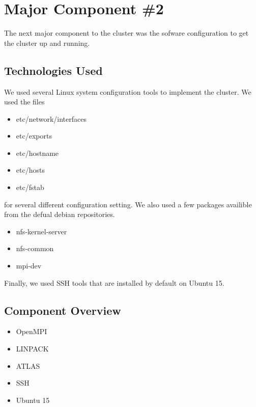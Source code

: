 
\section{Major Component \#2 }

The next major component to the cluster was the sofware configuration to get the cluster up and running.

\subsection{Technologies  Used}
We used several Linux system configuration tools to implement the cluster. We used the files
\begin{itemize}
	\item etc/network/interfaces
	\item etc/exports
	\item etc/hostname
	\item etc/hosts
	\item etc/fstab
\end{itemize}
for several different configuration setting. We also used a few packages availible from the defual debian repositories.
\begin{itemize}
	\item nfs-kernel-server
	\item nfs-common
	\item mpi-dev
\end{itemize}

Finally, we used SSH tools that are installed by default on Ubuntu 15.

\subsection{Component  Overview}
\begin{itemize}
	\item OpenMPI
	\item LINPACK
	\item ATLAS
	\item SSH
	\item Ubuntu 15
\end{itemize}

